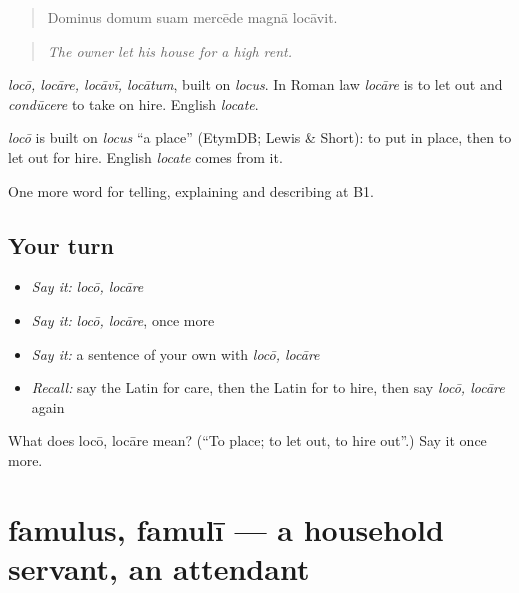 \begin{quote}
Dominus domum suam mercēde magnā locāvit.
\end{quote}

\begin{quote}
\emph{The owner let his house for a high rent.}
\end{quote}

\emph{locō, locāre, locāvī, locātum}, built on \emph{locus}. In Roman law \emph{locāre} is to let out and \emph{condūcere} to take on hire. English \emph{locate}.

\begin{cousinweb}
\emph{locō} is built on \emph{locus} \textquotedblleft{}a place\textquotedblright{} (EtymDB; Lewis \& Short): to put in place, then to let out for hire. English \emph{locate} comes from it.
\end{cousinweb}

\begin{grammarlens}[title={What you've built}]
One more word for telling, explaining and describing at B1.
\end{grammarlens}

\subsection*{Your turn}
\begin{itemize}
\raggedright
  \item \emph{Say it:} \emph{locō, locāre}
  \item \emph{Say it:} \emph{locō, locāre}, once more
  \item \emph{Say it:} a sentence of your own with \emph{locō, locāre}
  \item \emph{Recall:} say the Latin for care, then the Latin for to hire, then say \emph{locō, locāre} again
\end{itemize}

\begin{tcolorbox}[breakable,colback=teal!4,colframe=teal!35!black,title={Before you move on}]
What does locō, locāre mean? (\textquotedblleft{}To place; to let out, to hire out\textquotedblright{}.) Say it once more.
\end{tcolorbox}
\section[famulus, famulī]{famulus, famulī — a household servant, an attendant}

\label{lesson:LA-C380-famulus}



